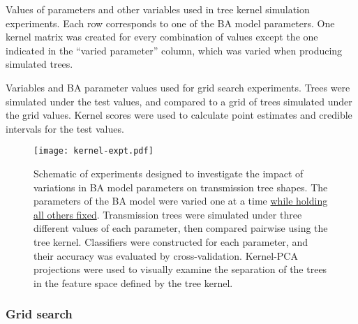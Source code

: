 \begin{landscape}
\begin{table}[ht]
  \centering
  
  \caption[Variables used in tree kernel simulation experiments]
  {
    Values of parameters and other variables used in tree kernel simulation
    experiments. Each row corresponds to one of the \gls{BA} model parameters.
    One kernel matrix was created for every combination of values except the
    one indicated in the ``varied parameter'' column, which was varied when
    producing simulated trees.
  }
  \label{tab:kernelexpt}
\end{table}

\begin{table}[ht]
  \centering
  
  \caption[Variables used in grid search experiments]
  {
    Variables and \gls{BA} parameter values used for grid search experiments. 
    Trees were simulated under the test values, and compared to a grid of trees
    simulated under the grid values. Kernel scores were used to calculate point
    estimates and credible intervals for the test values.
  }
  \label{tab:gridexpt}
\end{table}
\end{landscape}

\begin{figure}[ht]
  \centering
  \texttt{[image: kernel-expt.pdf]}
  \caption[Schematic of experiments investigating impact of BA model parameters
           on tree shape.]{
    Schematic of experiments designed to investigate the impact of variations
    in BA model parameters on transmission tree shapes. The parameters of the
    BA model were varied one at a time {\color{blue}\uline{while holding all
    others fixed}}. Transmission trees were simulated under three different
    values of each parameter, then compared pairwise using the tree kernel.
    Classifiers were constructed for each parameter, and their accuracy was
    evaluated by cross-validation. Kernel-PCA projections were used to visually
    examine the separation of the trees in the feature space defined by the
    tree kernel.
  }
  \label{fig:kernelexpt}
\end{figure}

\subsubsection*{Grid search}

